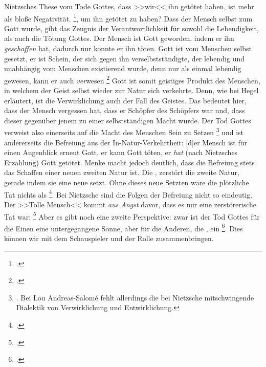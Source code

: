 \documentclass[12pt, a4paper, openany]{report}
\begin{document}
Nietzsches These vom Tode Gottes, dass >>wir<< ihn getötet haben, ist mehr als bloße Negativität. 
\footcite[][481]{nietzsche_morgenrote_1999}, um ihn getötet zu haben?
Dass der Mensch selbst zum Gott wurde, gibt das Zeugnis der Verantwortlichkeit für sowohl die Lebendigkeit, als auch die Tötung Gottes.
Der Mensch ist Gott geworden, indem er ihn \emph{geschaffen} hat, dadurch nur konnte er ihn töten. 
Gott ist vom Menschen selbst gesetzt, er ist Schein, der sich gegen ihn verselbstständigte, der lebendig und unabhängig vom Menschen existierend wurde, denn nur als einmal lebendig gewesen, kann er auch \emph{ver}wesen \footcite[][481]{nietzsche_morgenrote_1999}
Gott ist somit geistiges Produkt des Menschen, in welchem der Geist selbst wieder zur Natur sich verkehrte.
Denn, wie bei Hegel erläutert, ist die Verwirklichung auch der Fall des Geistes.
Das bedeutet hier, dass der Mensch vergessen hat, dass er Schöpfer des Schöpfers war und, dass dieser gegenüber jenem zu einer selbstständigen Macht wurde.
Der Tod Gottes verweist also einerseits auf die Macht des Menschen Sein zu Setzen%
\footnote{
    . 
    Bei Lou Andreas-Salomé fehlt allerdings die bei Nietzsche mitschwingende Dialektik von Verwirklichung und Entwirklichung.
} 
und ist andererseits die Befreiung aus der In-Natur-Verkehrtheit:
[d]er Mensch ist für einen Augenblick erneut Gott, er kann Gott töten, er \emph{hat} (nach Nietzsches Erzählung) Gott getötet.
Menke macht jedoch deutlich, dass die Befreiung stets das Schaffen einer neuen zweiten Natur ist. 
Die , zerstört die  zweite Natur, gerade indem sie eine neue setzt.
Ohne dieses neue Setzten wäre die plötzliche Tat nichts als \footcite[][§ 5 A, S. 39]{hegel_grundlinien_2017}.
Bei Nietzsche sind die Folgen der Befreiung nicht so eindeutig.
Der >>Tolle Mensch<< kommt \emph{aus Angst} davor, dass es nur eine zerstörerische Tat war: \footcite[][481]{nietzsche_morgenrote_1999}
Aber es gibt noch eine zweite Perspektive: 
zwar ist der Tod Gottes für die Einen eine untergegangene Sonne, aber für die Anderen, die , ein \footcite[][S. 573 - S. 574]{nietzsche_morgenrote_1999}.
Dies können wir mit dem Schauspieler und der Rolle zusammenbringen. 
\end{document}
